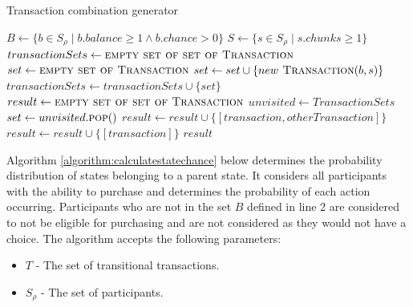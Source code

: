 \begin{algorithm}[H]
\caption{Transaction combination generator}
\label{algorithm:generatetransactions}
\begin{algorithmic}[1]
    \State $B \gets \{ b \in S_\rho \mid b.balance \geq 1 \land b.chance > 0 \}$
    \State $S \gets \{ s \in S_\rho \mid s.chunks \geq 1 \}$
    \State $transactionSets \gets \textsc{empty set of set of Transaction}$
        \State $set \gets \textsc{empty set of Transaction}$
            \State $set \gets set \cup \{new \textsc{ Transaction}(b, s)\}$
        \EndFor
        \State $transactionSets \gets transactionSets \cup \{set\}$
    \EndFor
    \State $result \gets \textsc{empty set of set of Transaction}$
    \State $unvisited \gets TransactionSets$
        \State $set \gets unvisited.\textsc{pop}()$
                        \State $result \gets result \cup \{[transaction, otherTransaction]\}$
                    \EndIf
                \EndFor
            \EndFor
            \State $result \gets result \cup \{[transaction]\}$
        \EndFor
    \EndWhile
    \State \Return $result$
\EndProcedure
\end{algorithmic}
\end{algorithm}

Algorithm \ref{algorithm:calculatestatechance} below determines the probability distribution of states belonging to a parent state. It considers all participants with the ability to purchase and determines the probability of each action occurring. Participants who are not in the set $B$ defined in line 2 are considered to not be eligible for purchasing and are not considered as they would not have a choice. The algorithm accepts the following parameters: 

\begin{itemize}
    \item $T$ - The set of transitional transactions.
    \item $S_\rho$ - The set of participants.
\end{itemize}

